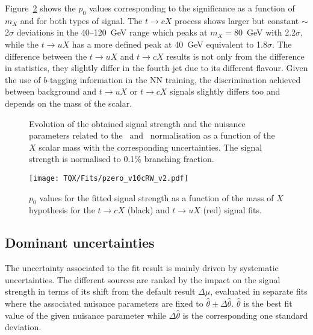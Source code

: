 Figure~\ref{tqX:p0values} shows the $p_0$ values corresponding to the significance as a function of $m_X$ and for both types of signal. The $t\to cX$ process shows larger but constant $\sim$2$\sigma$ deviations in the 40--120~GeV range which peaks at $m_X=80$~GeV with 2.2$\sigma$, while the $t\to uX$ has a more defined peak at 40~GeV equivalent to 1.8$\sigma$. The difference between the $t\to uX$ and $t\to cX$ results is not only from the difference in statistics, they slightly differ in the fourth jet due to its different flavour. Given the use of $b$-tagging information in the NN training, the discrimination achieved between background and $t\to uX$ or $t\to cX$ signals slightly differs too and depends on the mass of the scalar.\\

\begin{figure}[htb]
    \RawFloats
    \centering
    \caption{Evolution of the obtained signal strength and the nuisance parameters related to the \ttb\ and \ttc\ normalisation as a function of the $X$ scalar mass with the corresponding uncertainties. The signal strength is normalised to 0.1\% branching fraction.
    }
    \label{tqX:fittedfactorsvsmass}
\end{figure}

\begin{figure}[htb]
    \RawFloats
    \centering
    \texttt{[image: TQX/Fits/pzero\_v10cRW\_v2.pdf]}
    \caption{$p_0$ values for the fitted signal strength as a function of the mass of $X$ hypothesis for the $t\to cX$ (black) and $t\to uX$ (red) signal fits.}
    \label{tqX:p0values}
\end{figure}
\clearpage
\subsection{Dominant uncertainties}

The uncertainty associated to the fit result is mainly driven by systematic uncertainties. The different sources are ranked by the impact on the signal strength in terms of its shift from the default result $\Delta\mu$, evaluated in separate fits where the associated nuisance parameters are fixed to $\hat{\theta}\pm\Delta\hat{\theta}$. $\hat{\theta}$ is the best fit value of the given nuisance parameter while $\Delta\hat{\theta}$ is the corresponding one standard deviation.\\


